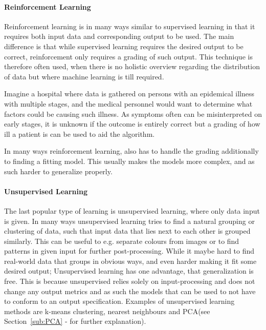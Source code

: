 \paragraph{Reinforcement Learning}
\label{par:ReinforcementLearning}
Reinforcement learning is in many ways similar to supervised learning in that it requires both input data and corresponding output to be used.
The main difference is that while supervised learning requires the desired output to be correct, reinforcement only requires a grading of such output.
This technique is therefore often used, when there is no holistic overview regarding the distribution of data but where machine learning is till required.
\begin{exm}
Imagine a hospital where data is gathered on persons with an epidemical illness with multiple stages, and the
medical personnel would want to determine what factors could be causing such illness. As symptoms often can be misinterpreted on early stages,
it is unknown if the outcome is entirely correct but a grading of how ill a patient is can be used to aid the algorithm.
\end{exm}
In many ways reinforcement learning, also has to handle the grading additionally to finding a fitting model. 
This usually makes the models more complex, and as such harder to generalize properly\cite{sutton96generalizationin}\cite{boyan95generalizationin}.

\paragraph{Unsupervised Learning}
\label{par:UnsupervisedLearning}
The last popular type of learning is unsupervised learning, where only data input is given.
In many ways unsupervised learning tries to find a natural grouping or clustering of data,
such that input data that lies next to each other is grouped similarly.
This can be useful to e.g. separate colours from images or to find patterns in given input for further post-processing.
While it maybe hard to find real-world data that groups in obvious ways, and even harder making it fit some desired output;
Unsupervised learning has one advantage, that generalization is free. This is because unsupervised relies solely on input-processing and does not change
any output metrics and as such the models that can be used to not have to conform to an output specification.
Examples of unsupervised learning methods are k-means clustering\cite{learningfromdata2012book}, nearest neighbours\cite{scikitlearn2012nearestneighbours} and PCA\cite{smith2002tutorial}(see Section~\ref{sub:PCA} -  for further explanation).

